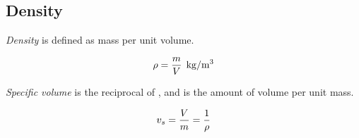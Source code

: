 \subsection{Density}\label{subsec:Density}
\begin{definition}[Density]\label{def:Density}
  \emph{Density} is defined as mass per unit volume.

  \begin{equation}\label{eq:Density}
    \Density = \frac{\Mass}{\Volume} \:\: \si[per-mode=symbol]{\kilo\gram\per\meter\cubed}
  \end{equation}
\end{definition}

\begin{definition}\label{def:Specific_Volume}
  \emph{Specific volume} is the reciprocal of , and is the amount of volume per unit mass.

  \begin{equation}\label{eq:Specific_Volume}
    \SpecificVolume = \frac{\Volume}{\Mass} = \frac{1}{\Density}
  \end{equation}
\end{definition}



